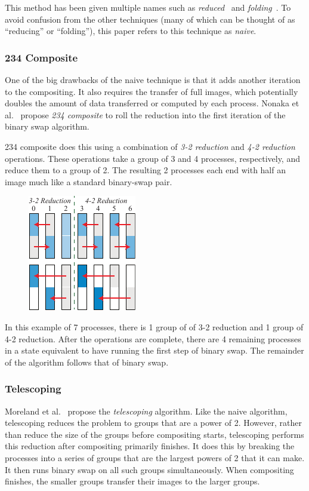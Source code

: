 \documentclass{vgtc}                          %
\newcommand*{\lcite}[1]{~\cite{#1}}
\newcommand*{\scite}[1]{~\cite{#1}}
\newcommand{\etal}{et al.\xspace}
\newcommand*{\keyterm}[1]{\emph{#1}}
\newcommand{\textalgorithm}[1]{\textsf{#1}\xspace}
\newcommand{\naive}{\textalgorithm{naive}}
\newcommand{\telescoping}{\textalgorithm{telescoping}}
\newcommand{\ttfcomposite}{\textalgorithm{234 composite}}
\newcommand{\Ttfcomposite}{\textalgorithm{234 composite}}
\begin{document}
This method has been given multiple names such as \keyterm{reduced}\lcite{23Swap} and \keyterm{folding}\lcite{Moreland2011:SC}.
To avoid confusion from the other techniques (many of which can be thought of as ``reducing'' or ``folding''), this paper refers to this technique as \keyterm{\naive}.

\subsubsection{234 Composite}

One of the big drawbacks of the \naive technique is that it adds another iteration to the compositing.
It also requires the transfer of full images, which potentially doubles the amount of data transferred or computed by each process.
Nonaka \etal\scite{Nonaka2015,Nonaka2018} propose \keyterm{\ttfcomposite} to roll the reduction into the first iteration of the binary swap algorithm.

\Ttfcomposite does this using a combination of \keyterm{3-2 reduction} and \keyterm{4-2 reduction} operations.
These operations take a group of 3 and 4 processes, respectively, and reduce them to a group of 2.
The resulting 2 processes each end with half an image much like a standard binary-swap pair.

\begin{figure}
  \includegraphics[scale=.75]{234-composite-6-proc}
\end{figure}
In this example of 7 processes, there is 1 group of of 3-2 reduction and 1 group of 4-2 reduction.
After the operations are complete, there are 4 remaining processes in a state equivalent to have running the first step of binary swap.
The remainder of the algorithm follows that of binary swap.

\subsubsection{Telescoping}

Moreland \etal\scite{Moreland2011:SC} propose the \keyterm{\telescoping} algorithm.
Like the \naive algorithm, \telescoping reduces the problem to groups that are a power of 2.
However, rather than reduce the size of the groups before compositing starts, \telescoping performs this reduction after compositing primarily finishes.
It does this by breaking the processes into a series of groups that are the largest powers of 2 that it can make.
It then runs binary swap on all such groups simultaneously.
When compositing finishes, the smaller groups transfer their images to the larger groups.
\end{document}
